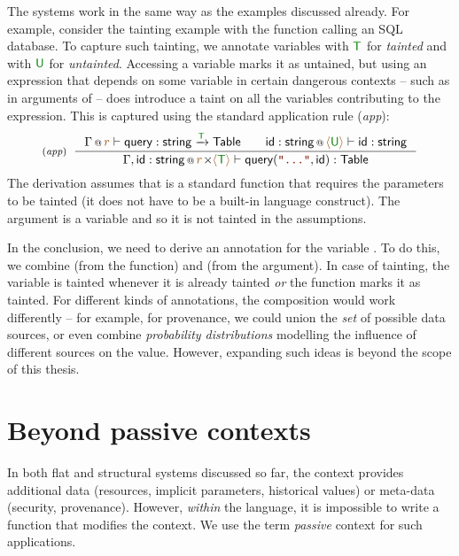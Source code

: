 The systems work in the same way as the examples discussed already. For example, consider the
tainting example with the  function calling an SQL database. To capture such 
tainting, we annotate variables with $\cclrd{\ident{T}}$ for \emph{tainted} and with 
$\cclrd{\ident{U}}$ for \emph{untainted}. Accessing a variable marks it as untained,
but using an expression that depends on some variable in certain dangerous contexts -- such 
as in arguments of  -- does introduce a taint on all the variables contributing to
the expression. This is captured using the standard application rule (\emph{app}):
%
\begin{equation*}
\tyrule{app}
  { \coctx{\Gamma}{\aclrd{r}} \vdash \ident{query} : \ident{string} \xrightarrow{\cclrd{\ident{T}}} \ident{Table} \qquad
    \coctx{\ident{id}:\ident{string}}{ \alift{\cclrd{\ident{U}}}} \vdash \ident{id} : \ident{string} }
  { \coctx{\Gamma, \ident{id}:\ident{string}}{ \aclrd{r} \cons \alift {\cclrd{\ident{T}}} \vdash \ident{query}(\str{...}, \ident{id}) : \ident{Table} } }
\end{equation*}
%
The derivation assumes that  is a standard function that requires the parameters
to be tainted (it does not have to be a built-in language construct). The argument is a 
variable and so it is not tainted in the assumptions.

In the conclusion, we need to derive an annotation for the variable . To do this, we
combine  (from the function) and  (from the argument). In case
of tainting, the variable is tainted whenever it is already tainted \emph{or} the function marks
it as tainted. For different kinds of annotations, the composition would work differently -- for
example, for provenance, we could union the \emph{set} of possible data sources, or even combine 
\emph{probability distributions} modelling the influence of different sources on the value.
However, expanding such ideas is beyond the scope of this thesis.


\section{Beyond passive contexts}

In both flat and structural systems discussed so far, the context provides additional data (resources, 
implicit parameters, historical values) or meta-data (security, provenance). However, \emph{within} 
the language, it is impossible to write a function that modifies the context. We use the term 
\emph{passive} context for such applications. 

